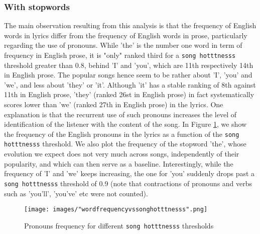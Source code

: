 \documentclass[10pt]{article}
\renewcommand\_{\textunderscore\allowbreak}
\begin{document}
\subsubsection{With stopwords}
The main observation resulting from this analysis is that the frequency of English words in lyrics differ from the frequency of English words in prose, particularly regarding the use of pronouns.
While 'the' is the number one word in term of frequency in English prose, it is "only" ranked third for a \texttt{song hotttnesss} threshold greater than 0.8, behind 'I' and 'you', which are 11th respectively 14th in English prose.
The popular songs hence seem to be rather about 'I', 'you' and 'we', and less about 'they' or 'it'.
Although 'it' has a stable ranking of 8th against 11th in English prose, 'they' (ranked 26st in English prose) in fact systematically scores lower than 'we' (ranked 27th in English prose) in the lyrics.
One explanation is that the recurrent use of such pronouns increases the level of identification of the listener with the content of the song.
In Figure \ref{fig:word_frequency_stopwords}, we show the frequency of the English pronouns in the lyrics as a function of the \texttt{song hotttnesss} threshold.
We also plot the frequency of the stopword 'the', whose evolution we expect does not very much across songs, independently of their popularity, and which can then serve as a baseline.
Interestingly, while the frequency of 'I' and 'we' keeps increasing, the one for 'you' suddenly drops past a \texttt{song hotttnesss} threshold of 0.9 (note that contractions of pronouns and verbs such as 'you'll', 'you've' etc were not counted).

\begin{figure}[h!]
\centering
\captionsetup{width=1.0\textwidth}
\texttt{[image: images/"word\_frequency\_vs\_song\_hotttnesss".png]}
\caption{Pronouns frequency for different \texttt{song hotttnesss} thresholds}
\label{fig:word_frequency_stopwords}
\end{figure}
\end{document}
